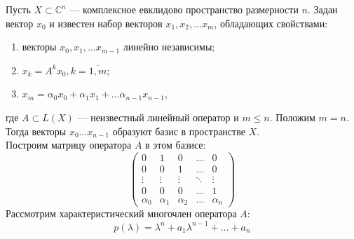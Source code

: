 

Пусть $X \subset \mathbb{C}^n$ --- комплексное евклидово пространство размерности $n$. 
Задан вектор $x_0$ и известен набор векторов $x_1,x_2, \dots x_m$, обладающих свойствами:
\begin{enumerate}
	\item векторы $x_0,x_1, \dots x_{m-1}$ линейно независимы;
	\item $x_k = A^k x_0, k= \overline{1,m}$;
	\item $x_m = \alpha_0 x_0 + \alpha_1 x_1 + \dots \alpha_{n-1} x_{n-1}$,
\end{enumerate}
где $A \subset L(X)$ --- неизвестный  линейный оператор и $m \leqslant n$. Положим $m=n$. 
Тогда векторы $x_0 \dots x_{n-1}$ образуют базис в пространстве $X$. \\

Построим матрицу оператора $A$ в этом базисе:
\[
	\begin{pmatrix}
		0 & 1 & 0 & \dots & 0 \\
		0 & 0 & 1 & \dots & 0 \\
		\vdots & \vdots & \vdots & \ddots & \vdots \\
		0 & 0 & 0 & \dots & 1 \\
		\alpha_0 & \alpha_1 & \alpha_2 & \dots & \alpha_n
	\end{pmatrix}
\]
Рассмотрим характеристический многочлен оператора $A$:
\[
	p(\lambda) = \lambda^n+a_1 \lambda^{n-1} + \dots + a_n
\]